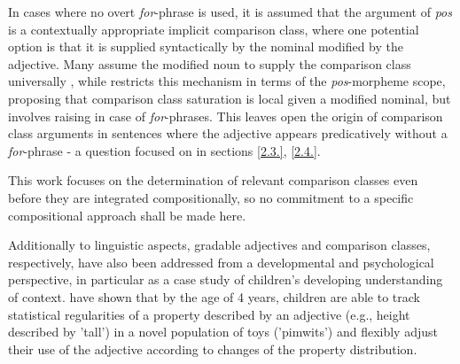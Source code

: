 In cases where no overt \textit{for}-phrase is used, it is assumed that the argument of \textit{pos} is a contextually appropriate implicit comparison class, where one potential option is that it is supplied syntactically by the nominal modified by the adjective. Many assume the modified noun to supply the comparison class universally \parencite[cf. e.g. ][]{Cresswell1976, Kamp1975, Heim2000}, while \textcite{Solt2009} restricts this mechanism in terms of the \textit{pos}-morpheme scope, proposing that comparison class saturation is local given a modified nominal, but involves raising in case of \textit{for}-phrases. This leaves open the origin of comparison class arguments in sentences where the adjective appears predicatively without a \textit{for}-phrase - a question focused on in sections \ref{2.3.}, \ref{2.4.}. 

This work focuses on the determination of relevant comparison classes even before they are integrated compositionally, so no commitment to a specific compositional approach shall be made here. %

Additionally to linguistic aspects, gradable adjectives and comparison classes, respectively, have also been addressed from a developmental and psychological perspective, in particular as a case study of children's developing understanding of context. 
\textcite{barner2008} have shown that by the age of 4 years, children are able to track statistical regularities of a property described by an adjective (e.g., height described by 'tall') in a novel population of toys ('pimwits') and flexibly adjust their use of the adjective according to changes of the property distribution. 
 
